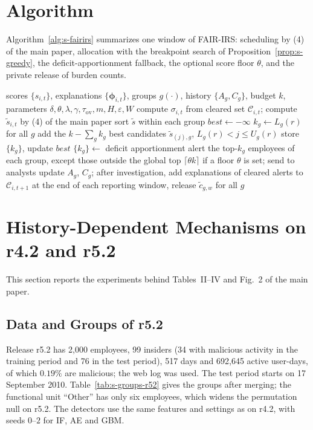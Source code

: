 \documentclass[10pt,onecolumn,letterpaper]{article}
\newcommand{\U}{\mathcal{U}}
\begin{document}
\section{Algorithm}
\label{sec:s-alg}
Algorithm~\ref{alg:s-fairirs} summarizes one window of FAIR-IRS: scheduling by (4) of the main paper, allocation with the breakpoint search of Proposition~\ref{prop:s-greedy}, the deficit-apportionment fallback, the optional score floor $\theta$, and the private release of burden counts.

\begin{algorithm}[!t]
\caption{FAIR-IRS (one window $t$)}\label{alg:s-fairirs}
\begin{algorithmic}[1]
\REQUIRE scores $\{s_{i,t}\}$, explanations $\{\boldsymbol{\phi}_{i,t}\}$, groups $g(\cdot)$, history $\{A_g,C_g\}$, budget $k$, parameters $\delta,\theta,\lambda,\gamma,\tau_{\mathrm{ov}},m,H,\varepsilon,W$
\FORALL{$i\in\U_t$}
  \STATE compute $\sigma_{i,t}$ from cleared set $\mathcal{C}_{i,t}$; compute $\tilde{s}_{i,t}$ by (4) of the main paper
\ENDFOR
\STATE sort $\tilde{s}$ within each group
\STATE $best\gets -\infty$
    \STATE $k_g\gets L_g(r)$ for all $g$
    \STATE add the $k-\sum_g k_g$ best candidates $\tilde{s}_{(j),g}$, $L_g(r)<j\le U_g(r)$
     \STATE store $\{k_g\}$, update $best$ \ENDIF
  \ENDIF
\ENDFOR
{} \STATE $\{k_g\}\gets$ deficit apportionment \ENDIF
\STATE alert the top-$k_g$ employees of each group, except those outside the global top $\lceil\theta k\rceil$ if a floor $\theta$ is set; send to analysts
\STATE update $A_g$, $C_g$; after investigation, add explanations of cleared alerts to $\mathcal{C}_{i,t+1}$
\STATE at the end of each reporting window, release $\tilde{c}_{g,w}$ for all $g$
\end{algorithmic}
\end{algorithm}

\section{History-Dependent Mechanisms on r4.2 and r5.2}
\label{sec:s-hist}
This section reports the experiments behind Tables~II--IV and Fig.~2 of the main paper.

\subsection{Data and Groups of r5.2}
Release r5.2 has 2{,}000 employees, 99 insiders (34 with malicious activity in the training period and 76 in the test period), 517 days and 692{,}645 active user-days, of which $0.19\%$ are malicious; the web log was used. The test period starts on 17 September 2010. Table~\ref{tab:s-groups-r52} gives the groups after merging; the functional unit ``Other'' has only six employees, which widens the permutation null on r5.2. The detectors use the same features and settings as on r4.2, with seeds $0$--$2$ for IF, AE and GBM.
\end{document}

